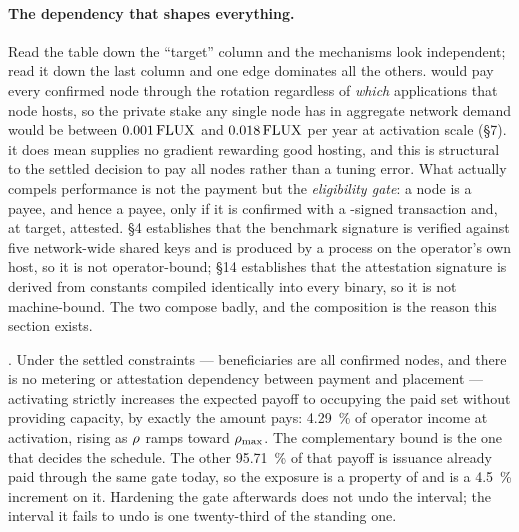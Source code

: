 \paragraph{The dependency that shapes everything.}
Read the table down the ``target'' column and the mechanisms look independent; read it down the last
column and one edge dominates all the others. \PNR would pay every confirmed node through the \PoN
rotation regardless of \emph{which} applications that node hosts, so the private stake any single
node has in aggregate network demand would be between $0.001\,\mathrm{FLUX}$ and $0.018\,\mathrm{FLUX}$ per year at
activation scale (\S7).  it does mean \PNR{} supplies no gradient rewarding
good hosting, and this is structural to the settled decision to pay all nodes rather than a tuning
error. What actually compels performance is not the payment but the \emph{eligibility gate}: a node
is a \PoN payee, and hence a \PNR payee, only if it is confirmed with a \fluxbench-signed transaction
and, at target, attested. \S4 establishes that the benchmark
signature is verified against five network-wide shared keys and is produced by a process on the
operator's own host, so it is not operator-bound; \S14 establishes that the attestation signature is
derived from constants compiled identically into every binary, so it is not machine-bound. The two
compose badly, and the composition is the reason this section exists.

\begin{property}
\label{prop:e2e-gate}
\planned. Under the settled \PNR constraints --- beneficiaries are all confirmed nodes, and there is
no metering or attestation dependency between payment and placement --- activating \PNR strictly
increases the expected payoff to occupying the paid set without providing capacity, by exactly the
amount \PNR pays: \SI{4.29}{\percent} of operator income at activation, rising as $\rho$ ramps
toward $\rho_{\max}$. The complementary bound is the one that decides the schedule. The other
\SI{95.71}{\percent} of that payoff is issuance already paid through the same gate today, so the
exposure is a property of \PoN{} and \PNR{} is a \SI{4.5}{\percent} increment on it. Hardening the
gate afterwards does not undo the interval; the interval it fails to undo is one twenty-third of the
standing one.
\end{property}

